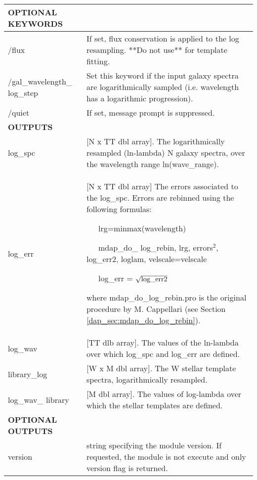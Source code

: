 \begin{center}
\begin{longtable}{p{2.7cm}| p{11.1cm}}
%
\hline
{\bf  OPTIONAL KEYWORDS}  & \\
\hline
/flux    &                  If set, flux conservation is applied to the log resampling. **Do not use** for template fitting.\\
/gal\_wavelength\_ log\_step &  Set this keyword if the input galaxy spectra are logarithmically sampled (i.e. wavelength has a logarithmic progression).\\
/quiet    &                    If set, message prompt is suppressed.\\
\hline
{\bf  OUTPUTS} &  \\
\hline
%
log\_spc  &  [N x TT dbl array]. The logarithmically resampled (ln-lambda) N galaxy spectra, over the wavelength range ln(wave\_range).\\
%
log\_err &   [N x TT dbl array]  The errors associated to the log\_spc. Errors are rebinned using the following formulas:


                              \ \ \   lrg=minmax(wavelength)

                              \ \ \   mdap\_do\_ log\_rebin, lrg, errors$^2$, log\_err2, loglam, velscale=velscale

                              \ \ \  log\_err = $\sqrt{{\rm log\_err2}}$

                             where mdap\_do\_log\_rebin.pro is the original procedure by M. Cappellari (see
                             Section \ref{dap_sec:mdap_do_log_rebin}).\\
%
log\_wav &   [TT dlb array].    The values of the ln-lambda over which log\_spc and log\_err are defined.\\
%
library\_log & [W x M dbl array]. The W stellar template spectra, logarithmically resampled.\\
%
log\_wav\_ library &[M dbl array]. The values of log-lambda over which the stellar templates are defined.\\
\hline
{\bf  OPTIONAL OUTPUTS} &  \\
\hline
version & string specifying the module version. If requested, the module is not execute and only version flag is returned.\\
\hline
\end{longtable}
\end{center}
